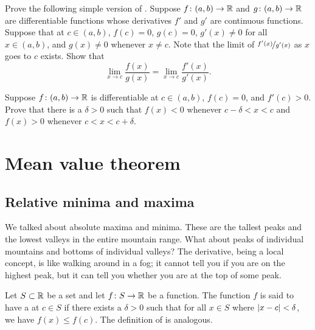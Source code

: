 \begin{exercise} \label{exercise:simpleLHopital}
Prove the following simple version of .
Suppose 
$f \colon (a,b) \to {\mathbb{R}}$ and $g \colon (a,b) \to {\mathbb{R}}$ are differentiable
functions
whose derivatives $f'$ and $g'$ are continuous functions.
Suppose that at $c \in (a,b)$, $f(c) = 0$, $g(c)=0$,
$g'(x) \not= 0$ for all $x \in (a,b)$, and
$g(x) \not= 0$ whenever $x \not= c$.   Note
that the limit of $\nicefrac{f'(x)}{g'(x)}$ as $x$ goes to $c$ exists.  Show that
\begin{equation*}
\lim_{x \to c} \frac{f(x)}{g(x)} = 
\lim_{x \to c} \frac{f'(x)}{g'(x)} .
\end{equation*}
\end{exercise}

\begin{exercise}
Suppose $f \colon (a,b) \to {\mathbb{R}}$ is differentiable at $c \in (a,b)$,
$f(c)=0$, and $f'(c) > 0$.
Prove that there is a $\delta > 0$ such that $f(x) < 0$
whenever $c-\delta < x < c$ and
$f(x) > 0$ 
whenever $c < x < c+\delta$.
\end{exercise}


\sectionnewpage
\section{Mean value theorem}
\label{sec:mvt}



\subsection{Relative minima and maxima}

We talked about absolute maxima and minima.  These are the tallest peaks and
the lowest valleys in the entire mountain range.  What
about peaks of individual mountains and bottoms of individual valleys?
The derivative, being a local concept, is like walking around in a fog; it
cannot tell you if you are on the highest peak, but it can tell you whether you are
at the top of some peak.

\begin{defn}
Let $S \subset {\mathbb{R}}$ be a set and
let $f \colon S \to {\mathbb{R}}$ be a function.  The function $f$ is said to have
a \emph{}
at $c \in S$ if there exists a $\delta>0$
such that for all $x \in S$ where $\left\lvert {x-c} \right\rvert < \delta$,
we have $f(x) \leq f(c)$.
The definition of
\emph{}
is analogous.
\end{defn}

